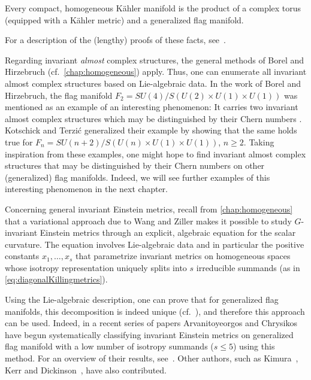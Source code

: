\begin{thm}\label{thm:Matsu}
	Every compact, homogeneous K\"ahler manifold is the product of a complex torus (equipped with a K\"ahler metric) and a generalized flag manifold.
\end{thm}

For a description of the (lengthy) proofs of these facts, see~\cite[Ch.~8]{Bes2008}.

Regarding invariant \emph{almost} complex structures, the general methods of Borel and Hirzebruch (cf.~\cref{chap:homogeneous}) apply. Thus, one can enumerate all invariant almost complex structures based on Lie-algebraic data. In the work of Borel and Hirzebruch, the flag manifold $F_2=SU(4)/S(U(2)\times U(1)\times U(1))$ was mentioned as an example of an interesting phenomenon: It carries two invariant almost complex structures which may be distinguished by their Chern numbers \cite[\S 13.9 and \S 24.11]{BH1958a}. Kotschick and Terzi\'c generalized their example by showing that the same holds true for $F_n=SU(n+2)/S(U(n)\times U(1)\times U(1))$, $n\geq 2$. Taking inspiration from these examples, one might hope to find invariant almost complex structures that may be distinguished by their Chern numbers on other (generalized) flag manifolds. Indeed, we will see further examples of this interesting phenomenon in the next chapter.

Concerning general invariant Einstein metrics, recall from \cref{chap:homogeneous} that a variational approach due to Wang and Ziller makes it possible to study $G$-invariant Einstein metrics through an explicit, algebraic equation for the scalar curvature. The equation involves Lie-algebraic data and in particular the positive constants $x_1,\dots,x_s$ that parametrize invariant metrics on homogeneous spaces whose isotropy representation uniquely splits into $s$ irreducible summands (as in \cref{eq:diagonalKillingmetrics}).

Using the Lie-algebraic description, one can prove that for generalized flag manifolds, this decomposition is indeed unique (cf.~\cite[Thm.~7.3]{Arv2003}), and therefore this approach can be used. Indeed, in a recent series of papers Arvanitoyeorgos and Chrysikos have begun systematically classifying invariant Einstein metrics on generalized flag manifold with a low number of isotropy summands ($s\leq 5$) using this method. For an overview of their results, see~\cite{AC2010,ACS2013a}. Other authors, such as Kimura~\cite{Kim1990}, Kerr and Dickinson~\cite{Ker1996,DK2008}, have also contributed.

